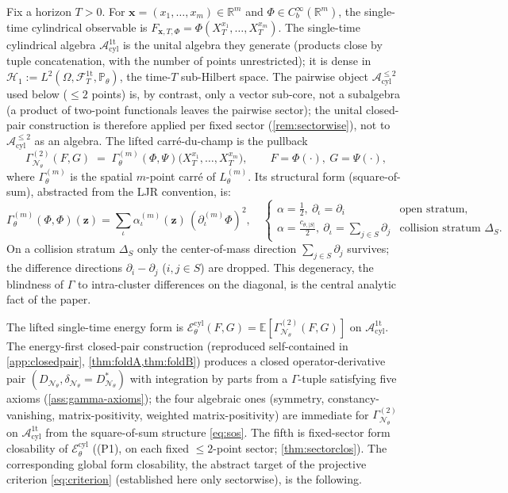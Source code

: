 \documentclass[reqno,final,11pt]{amsart}
\theoremstyle{plain}
\theoremstyle{definition}
\theoremstyle{remark}
\newcommand{\R}{\mathbb R}
\newcommand{\E}{\mathbb E}
\newcommand{\Prob}{\mathbb P}
\newcommand{\cA}{\mathcal A}
\newcommand{\cE}{\mathcal E}
\newcommand{\cF}{\mathcal F}
\newcommand{\cN}{\mathcal N}
\newcommand{\GamN}{\Gamma^{(2)}_{\cN_\theta}}
\newcommand{\Lth}[1]{L^{(#1)}_{\theta}}
\newcommand{\DN}{D_{\cN_\theta}}
\newcommand{\divN}{\delta_{\cN_\theta}}
\newcommand{\Pth}{\Prob_{\theta}}
\newcommand{\Hone}{\mathcal H_{1}}
\newcommand{\Aone}{\cA^{\mathrm{1t}}_{\mathrm{cyl}}}
\newcommand{\Apair}{\cA^{\le 2}_{\mathrm{cyl}}}
\newcommand{\Ecyl}{\cE^{\mathrm{cyl}}_{\theta}}
\begin{document}
Fix a horizon $T>0$. For $\mathbf x=(x_1,\dots,x_m)\in\R^m$ and
$\Phi\in C_b^\infty(\R^m)$, the single-time cylindrical observable is
$F_{\mathbf x,T,\Phi}=\Phi(X^{x_1}_T,\dots,X^{x_m}_T)$. The single-time
cylindrical algebra $\Aone$ is the unital algebra they generate (products close
by tuple concatenation, with the number of points unrestricted); it is dense in
$\Hone:=L^2(\Omega,\cF_T^{\mathrm{1t}},\Pth)$, the time-$T$ sub-Hilbert space.
The pairwise object $\Apair$ used below ($\le2$ points) is, by contrast, only a
vector sub-core, not a subalgebra (a product of two-point functionals
leaves the pairwise sector); the unital closed-pair construction is therefore
applied per fixed sector (\cref{rem:sectorwise}), not to $\Apair$ as an algebra. The lifted carr\'e-du-champ is the pullback
\begin{equation}\label{eq:lifted-gamma}
  \GamN(F,G)\;=\;\Gamma^{(m)}_\theta(\Phi,\Psi)\bigl(X^{x_1}_T,\dots,X^{x_m}_T\bigr),
  \qquad F=\Phi(\cdot),\ G=\Psi(\cdot),
\end{equation}
where $\Gamma^{(m)}_\theta$ is the spatial $m$-point carr\'e of $\Lth{m}$.
Its structural form (square-of-sum), abstracted from the LJR convention, is:
\begin{equation}\label{eq:sos}
  \Gamma^{(m)}_\theta(\Phi,\Phi)(\mathbf z)
  =\sum_{\iota}\alpha^{(m)}_\iota(\mathbf z)\,(\partial^{(m)}_\iota\Phi)^2,
  \quad
  \begin{cases}
   \alpha=\tfrac12,\ \partial_\iota=\partial_i & \text{open stratum},\\
   \alpha=\tfrac{c_{\theta,|S|}}{2},\ \partial_\iota=\sum_{j\in S}\partial_j
     & \text{collision stratum }\Delta_S.
  \end{cases}
\end{equation}
On a collision stratum $\Delta_S$ only the center-of-mass direction
$\sum_{j\in S}\partial_j$ survives; the difference directions
$\partial_i-\partial_j$ ($i,j\in S$) are dropped. This degeneracy, the blindness
of $\Gamma$ to intra-cluster differences on the diagonal, is the central analytic
fact of the paper.

The lifted single-time energy form is $\Ecyl(F,G)=\E[\GamN(F,G)]$ on $\Aone$.
The energy-first closed-pair construction (reproduced self-contained in
\cref{app:closedpair}, \cref{thm:foldA,thm:foldB}) produces a closed
operator-derivative pair $(\DN,\divN=\DN^{*})$ with integration by parts from a
$\Gamma$-tuple satisfying five axioms (\cref{ass:gamma-axioms}); the four
algebraic ones (symmetry, constancy-vanishing, matrix-positivity, weighted
matrix-positivity) are immediate for $\GamN$ on $\Aone$ from the square-of-sum
structure \eqref{eq:sos}. The fifth is fixed-sector form closability of $\Ecyl$
(\textnormal{(P1)}, on each fixed $\le2$-point sector; \cref{thm:sectorclos}). The
corresponding global form closability, the abstract target of the
projective criterion \eqref{eq:criterion} (established here only sectorwise), is the following.
\end{document}
